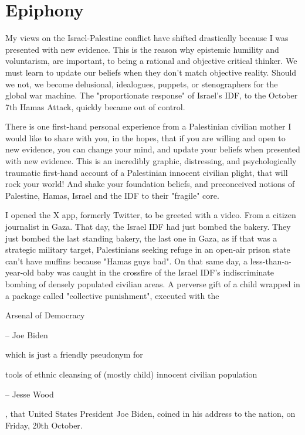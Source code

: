 \documentclass[16pt,openany,oneside]{book}
\begin{document}
\chapter{Epiphony}

My views on the Israel-Palestine conflict have shifted drastically because I was presented with new evidence. This is the reason why epistemic humility and voluntarism, are important, to being a rational and objective critical thinker. We must learn to update our beliefs when they don't match objective reality. Should we not, we become delusional, idealogues, puppets, or stenographers for the global war machine. The "proportionate response" of Israel's IDF, to the October 7th Hamas Attack, quickly became out of control. 

There is one first-hand personal experience from a Palestinian civilian mother I would like to share with you, in the hopes, that if you are willing and open to new evidence, you can change your mind, and update your beliefs when presented with new evidence. This is an incredibly graphic, distressing, and psychologically traumatic first-hand account of a Palestinian innocent civilian plight, that will rock your world! And shake your foundation beliefs, and preconceived notions of Palestine, Hamas, Israel and the IDF to their "fragile" core.

I opened the X app, formerly Twitter, to be greeted with a video. From a citizen journalist in Gaza. That day, the Israel IDF had just bombed the bakery. They just bombed the last standing bakery, the last one in Gaza, as if that was a strategic military target, Palestinians seeking refuge in an open-air prison state can't have muffins because "Hamas guys bad". On that same day, a less-than-a-year-old baby was caught in the crossfire of the Israel IDF's indiscriminate bombing of densely populated civilian areas. A perverse gift of a child wrapped in a package called "collective punishment", executed with the 

\epigraph{
    Arsenal of Democracy
}{-- Joe Biden \cite{pbs2023biden}}

which is just a friendly pseudonym for

\epigraph{
    tools of ethnic cleansing of (mostly child) innocent civilian population
}{-- Jesse Wood}

, that United States President Joe Biden, coined in his address to the nation, on Friday, 20th October\cite{pbs2023biden}.
\end{document}
